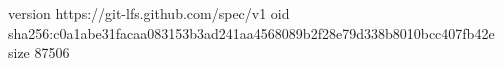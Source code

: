 version https://git-lfs.github.com/spec/v1
oid sha256:c0a1abe31facaa083153b3ad241aa4568089b2f28e79d338b8010bcc407fb42e
size 87506
